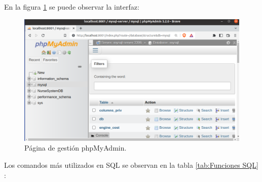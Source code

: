 En la figura \ref{fig:Página phpMyAdmin} se puede observar la interfaz:

 
\begin{figure}[ht]
	\centering
	\includegraphics[scale=.35]{./Figures/phpMyAdmin.png}
	\caption{Página de gestión phpMyAdmin.}
	\label{fig:Página phpMyAdmin}
\end{figure}

\pagebreak
Los comandos más utilizados en SQL se observan en la tabla \ref{tab:Funciones SQL} \citep{BOOK:2}:

